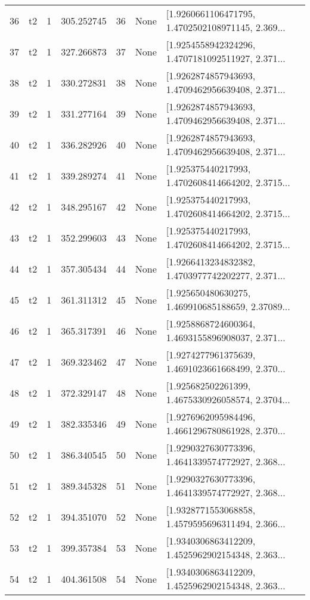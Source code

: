\begin{tabular}{lllrlll}
36  &  t2 &   1 &   305.252745 &   36 &  None &  [1.9260661106471795, 1.4702502108971145, 2.369... \\
37  &  t2 &   1 &   327.266873 &   37 &  None &  [1.9254558942324296, 1.4707181092511927, 2.371... \\
38  &  t2 &   1 &   330.272831 &   38 &  None &  [1.9262874857943693, 1.4709462956639408, 2.371... \\
39  &  t2 &   1 &   331.277164 &   39 &  None &  [1.9262874857943693, 1.4709462956639408, 2.371... \\
40  &  t2 &   1 &   336.282926 &   40 &  None &  [1.9262874857943693, 1.4709462956639408, 2.371... \\
41  &  t2 &   1 &   339.289274 &   41 &  None &  [1.925375440217993, 1.4702608414664202, 2.3715... \\
42  &  t2 &   1 &   348.295167 &   42 &  None &  [1.925375440217993, 1.4702608414664202, 2.3715... \\
43  &  t2 &   1 &   352.299603 &   43 &  None &  [1.925375440217993, 1.4702608414664202, 2.3715... \\
44  &  t2 &   1 &   357.305434 &   44 &  None &  [1.9266413234832382, 1.4703977742202277, 2.371... \\
45  &  t2 &   1 &   361.311312 &   45 &  None &  [1.925650480630275, 1.469910685188659, 2.37089... \\
46  &  t2 &   1 &   365.317391 &   46 &  None &  [1.9258868724600364, 1.4693155896908037, 2.371... \\
47  &  t2 &   1 &   369.323462 &   47 &  None &  [1.9274277961375639, 1.4691023661668499, 2.370... \\
48  &  t2 &   1 &   372.329147 &   48 &  None &  [1.925682502261399, 1.4675330926058574, 2.3704... \\
49  &  t2 &   1 &   382.335346 &   49 &  None &  [1.9276962095984496, 1.4661296780861928, 2.370... \\
50  &  t2 &   1 &   386.340545 &   50 &  None &  [1.9290327630773396, 1.4641339574772927, 2.368... \\
51  &  t2 &   1 &   389.345328 &   51 &  None &  [1.9290327630773396, 1.4641339574772927, 2.368... \\
52  &  t2 &   1 &   394.351070 &   52 &  None &  [1.9328771553068858, 1.4579595696311494, 2.366... \\
53  &  t2 &   1 &   399.357384 &   53 &  None &  [1.9340306863412209, 1.4525962902154348, 2.363... \\
54  &  t2 &   1 &   404.361508 &   54 &  None &  [1.9340306863412209, 1.4525962902154348, 2.363... \\

\end{tabular}
